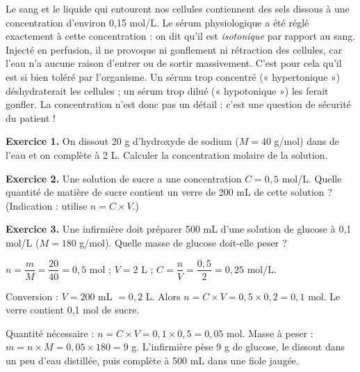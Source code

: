 \documentclass[11pt]{article}
\begin{document}
\begin{savaistu}
Le sang et le liquide qui entourent nos cellules contiennent des sels dissous à une concentration d'environ 0,15 mol/L. Le sérum physiologique a été réglé exactement à cette concentration : on dit qu'il est \emph{isotonique} par rapport au sang. Injecté en perfusion, il ne provoque ni gonflement ni rétraction des cellules, car l'eau n'a aucune raison d'entrer ou de sortir massivement. C'est pour cela qu'il est si bien toléré par l'organisme. Un sérum trop concentré (« hypertonique ») déshydraterait les cellules ; un sérum trop dilué (« hypotonique ») les ferait gonfler. La concentration n'est donc pas un détail : c'est une question de sécurité du patient !
\end{savaistu}

\begin{exercice}
\textbf{Exercice 1.} On dissout 20 g d'hydroxyde de sodium  ($M = 40$ g/mol) dans de l'eau et on complète à 2 L. Calculer la concentration molaire de la solution.

\textbf{Exercice 2.} Une solution de sucre a une concentration $C = 0,5$ mol/L. Quelle quantité de matière de sucre contient un verre de 200 mL de cette solution ? (Indication : utilise $n = C \times V$.)

\textbf{Exercice 3.} Une infirmière doit préparer 500 mL d'une solution de glucose à 0,1 mol/L ($M = 180$ g/mol). Quelle masse de glucose doit-elle peser ?
\end{exercice}

\begin{corrige}[Exercice 1]
$n = \dfrac{m}{M} = \dfrac{20}{40} = 0,5$ mol ; $V = 2$ L ; $C = \dfrac{n}{V} = \dfrac{0,5}{2} = 0,25$ mol/L.
\end{corrige}

\begin{corrige}[Exercice 2]
Conversion : $V = 200$ mL $= 0,2$ L. Alors $n = C \times V = 0,5 \times 0,2 = 0,1$ mol. Le verre contient 0,1 mol de sucre.
\end{corrige}

\begin{corrige}[Exercice 3]
Quantité nécessaire : $n = C \times V = 0,1 \times 0,5 = 0,05$ mol. Masse à peser : $m = n \times M = 0,05 \times 180 = 9$ g. L'infirmière pèse 9 g de glucose, le dissout dans un peu d'eau distillée, puis complète à 500 mL dans une fiole jaugée.
\end{corrige}
\end{document}
